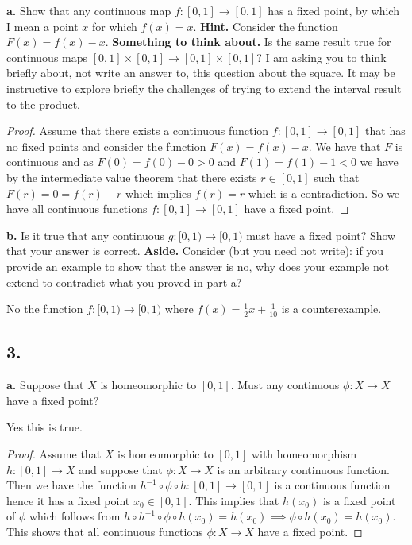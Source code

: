 \documentclass{amsart}
\theoremstyle{plain}
\theoremstyle{definition}
\theoremstyle{remark}
\begin{document}
{\bfseries a.}  Show that any continuous map $f : [0,1] \rightarrow [0,1]$ has a fixed point, by which I mean a point $x$ for which $f(x) = x$. {\bfseries Hint.} Consider the function $F(x) = f(x) - x$. {\bfseries Something to think about.} Is the same result true for continuous maps $[0,1] \times [0,1] \rightarrow [0,1] \times [0,1]$? I am asking you to think briefly about, not write an answer to, this question about the square. It may be instructive to explore briefly the challenges of trying to extend the interval result to the product. 

\begin{proof}
    Assume that there exists a continuous function $f:[0,1]\to [0,1]$ that has no fixed points and consider the function $F(x)=f(x)-x$. We have that $F$ is continuous and as $F(0)=f(0)-0>0$ and $F(1)=f(1)-1<0$ we have by the intermediate value theorem that there exists $r\in [0,1]$ such that $F(r)=0=f(r)-r$ which implies $f(r)=r$ which is a contradiction. So we have all continuous functions $f:[0,1]\to [0,1]$ have a fixed point.
\end{proof}

\vspace{.1in}
{\bfseries b.} Is it true that any continuous $g : [0,1) \rightarrow [0,1)$ must have a fixed point? Show that your answer is correct. {\bfseries Aside.} Consider (but you need not write): if you provide an example to show that the answer is no, why does your example not extend to contradict what you proved in part a?

No the function $f:[0,1)\to [0,1)$ where $f(x)=\frac{1}{2}x+\frac{1}{10}$ is a counterexample. 


\vspace{.15in}
\noindent
\subsection*{3.}

\vspace{.1in}
{\bfseries a.} Suppose that $X$ is homeomorphic to $[0,1]$. Must any continuous $\phi : X \rightarrow X$ have a fixed point? 




Yes this is true.
\begin{proof}
    Assume that $X$ is homeomorphic to $[0,1]$ with homeomorphism $h:[0,1]\to X$ and suppose that $\phi : X\to X$ is an arbitrary continuous function. Then we have the function $h^{-1}\circ \phi \circ h:[0,1]\to [0,1] $ is a continuous function hence it has a fixed point $x_0\in [0,1]$. This implies that $h(x_0)$ is a fixed point of $\phi$ which follows from $h\circ h^{-1}\circ \phi \circ h(x_0)=h(x_0)\implies \phi \circ h(x_0)=h(x_0)$. This shows that all continuous functions $\phi:X\to X$ have a fixed point.
\end{proof}
\end{document}
